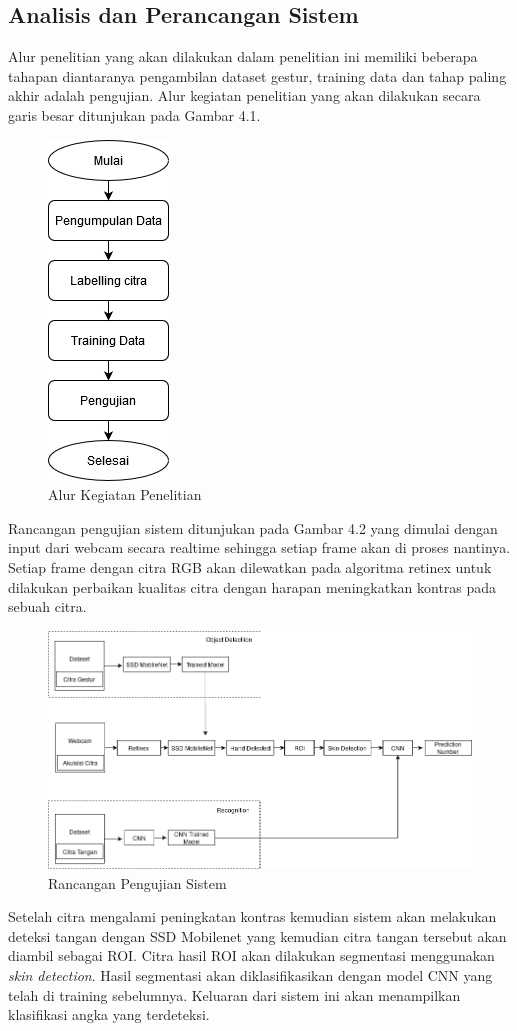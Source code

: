 \subsection{Analisis dan Perancangan Sistem}
Alur penelitian yang akan dilakukan dalam penelitian ini memiliki beberapa tahapan diantaranya pengambilan dataset gestur, training data dan tahap paling akhir adalah pengujian. Alur kegiatan penelitian yang akan dilakukan secara garis besar ditunjukan pada Gambar 4.1.
\begin{figure}[H]
	\centering
	\includegraphics[width=0.2\linewidth]{Rencana}
	\caption{Alur Kegiatan Penelitian}
	\label{fig:screenshot006}
\end{figure}
Rancangan pengujian sistem ditunjukan pada Gambar 4.2 yang dimulai dengan input dari webcam secara realtime sehingga setiap frame akan di proses nantinya.
Setiap frame dengan citra RGB akan dilewatkan pada algoritma retinex untuk dilakukan perbaikan kualitas citra dengan harapan meningkatkan kontras pada sebuah citra.
\begin{figure}[H]
	\centering
	\includegraphics[width=0.9\linewidth]{rancangan}
	\caption{Rancangan Pengujian Sistem}
	\label{fig:rancangan}
\end{figure}
\noindent Setelah citra mengalami peningkatan kontras kemudian sistem akan melakukan deteksi tangan dengan SSD Mobilenet yang kemudian citra tangan tersebut akan diambil sebagai ROI. 
Citra hasil ROI akan dilakukan segmentasi menggunakan \emph{skin detection}. Hasil segmentasi akan diklasifikasikan dengan model CNN yang telah di training sebelumnya.
Keluaran dari sistem ini akan menampilkan klasifikasi angka yang terdeteksi.
